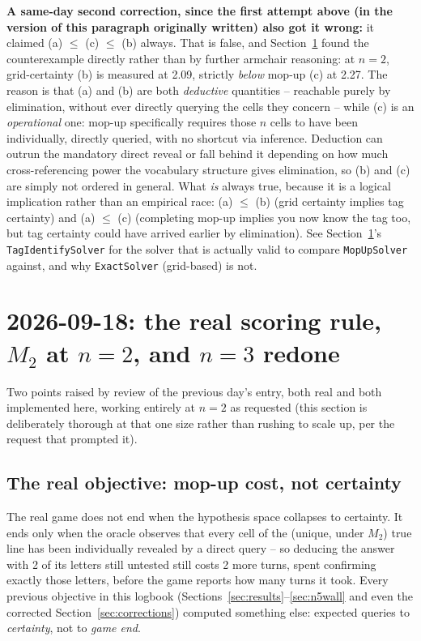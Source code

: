 \documentclass[11pt]{article}
\begin{document}
\textbf{A same-day second correction, since the first attempt above (in
the version of this paragraph originally written) also got it wrong:} it
claimed (a) $\le$ (c) $\le$ (b) always. That is false, and Section~\ref{sec:mopup}
found the counterexample directly rather than by further armchair
reasoning: at $n=2$, grid-certainty (b) is measured at 2.09, strictly
\emph{below} mop-up (c) at 2.27. The reason is that (a) and (b) are both
\emph{deductive} quantities -- reachable purely by elimination, without
ever directly querying the cells they concern -- while (c) is an
\emph{operational} one: mop-up specifically requires those $n$ cells to
have been individually, directly queried, with no shortcut via inference.
Deduction can outrun the mandatory direct reveal or fall behind it
depending on how much cross-referencing power the vocabulary structure
gives elimination, so (b) and (c) are simply not ordered in general. What
\emph{is} always true, because it is a logical implication rather than an
empirical race: (a) $\le$ (b) (grid certainty implies tag certainty) and
(a) $\le$ (c) (completing mop-up implies you now know the tag too, but
tag certainty could have arrived earlier by elimination). See
Section~\ref{sec:mopup}'s \texttt{TagIdentifySolver} for the solver that
is actually valid to compare \texttt{MopUpSolver} against, and why
\texttt{ExactSolver} (grid-based) is not.

\section{2026-09-18: the real scoring rule, $M_2$ at $n=2$, and $n=3$ redone}
\label{sec:mopup}

Two points raised by review of the previous day's entry, both real and
both implemented here, working entirely at $n=2$ as requested (this
section is deliberately thorough at that one size rather than rushing to
scale up, per the request that prompted it).

\subsection{The real objective: mop-up cost, not certainty}

The real game does not end when the hypothesis space collapses to
certainty. It ends only when the oracle observes that every cell of the
(unique, under $M_2$) true line has been individually revealed by a
direct query -- so deducing the answer with 2 of its letters still
untested still costs 2 more turns, spent confirming exactly those
letters, before the game reports how many turns it took. Every previous
objective in this logbook (Sections~\ref{sec:results}--\ref{sec:n5wall}
and even the corrected Section~\ref{sec:corrections}) computed something
else: expected queries to \emph{certainty}, not to \emph{game end}.
\end{document}
